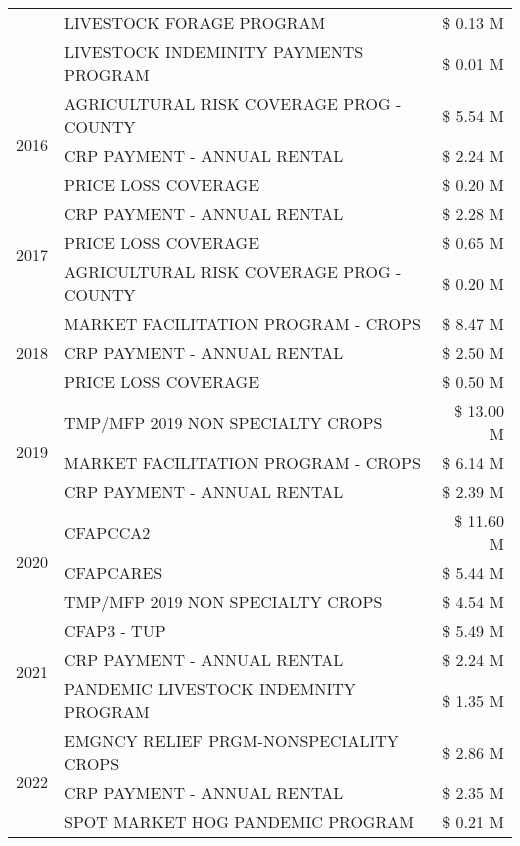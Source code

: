 \begin{tabular}{llr}
 & LIVESTOCK FORAGE PROGRAM & \$ 0.13 M \\
 & LIVESTOCK INDEMINITY PAYMENTS PROGRAM & \$ 0.01 M \\
\cline{1-3}
\multirow[t]{3}{*}{2016} & AGRICULTURAL RISK COVERAGE PROG - COUNTY & \$ 5.54 M \\
 & CRP PAYMENT - ANNUAL RENTAL & \$ 2.24 M \\
 & PRICE LOSS COVERAGE & \$ 0.20 M \\
\cline{1-3}
\multirow[t]{3}{*}{2017} & CRP PAYMENT - ANNUAL RENTAL & \$ 2.28 M \\
 & PRICE LOSS COVERAGE & \$ 0.65 M \\
 & AGRICULTURAL RISK COVERAGE PROG - COUNTY & \$ 0.20 M \\
\cline{1-3}
\multirow[t]{3}{*}{2018} & MARKET FACILITATION PROGRAM - CROPS & \$ 8.47 M \\
 & CRP PAYMENT - ANNUAL RENTAL & \$ 2.50 M \\
 & PRICE LOSS COVERAGE & \$ 0.50 M \\
\cline{1-3}
\multirow[t]{3}{*}{2019} & TMP/MFP 2019 NON SPECIALTY CROPS & \$ 13.00 M \\
 & MARKET FACILITATION PROGRAM - CROPS & \$ 6.14 M \\
 & CRP PAYMENT - ANNUAL RENTAL & \$ 2.39 M \\
\cline{1-3}
\multirow[t]{3}{*}{2020} & CFAPCCA2 & \$ 11.60 M \\
 & CFAPCARES & \$ 5.44 M \\
 & TMP/MFP 2019 NON SPECIALTY CROPS & \$ 4.54 M \\
\cline{1-3}
\multirow[t]{3}{*}{2021} & CFAP3 - TUP & \$ 5.49 M \\
 & CRP PAYMENT - ANNUAL RENTAL & \$ 2.24 M \\
 & PANDEMIC LIVESTOCK INDEMNITY PROGRAM & \$ 1.35 M \\
\cline{1-3}
\multirow[t]{3}{*}{2022} & EMGNCY RELIEF PRGM-NONSPECIALITY CROPS & \$ 2.86 M \\
 & CRP PAYMENT - ANNUAL RENTAL & \$ 2.35 M \\
 & SPOT MARKET HOG PANDEMIC PROGRAM & \$ 0.21 M \\
\cline{1-3}
\bottomrule
\end{tabular}
